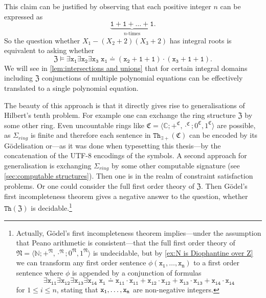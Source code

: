 This claim can be justified by observing that each positive integer $n$ can
be expressed as
\[
  \underbrace{\mathtt{1 + 1 + … + 1}}_{n\text{-times}}.
\]
So the question whether $X_1 - (X_2 + 2) (X_3 + 2)$ has integral roots is
equivalent to asking whether
\[
  \mathfrak Z \models \mathtt{∃ x_1 ∃ x_2 ∃ x_3 \; x_1 \doteq (x_2 + 1 + 1) \cdot (x_3 + 1 + 1)}.
\]
We will see in \cref{lem:intersections and unions} that for certain integral
domains including $\mathfrak Z$ conjunctions of multiple polynomial equations
can be effectively translated to a single polynomial equation.

The beauty of this approach is that it directly gives rise to generalisations of
Hilbert's tenth problem. For example one can exchange the ring structure
$\mathfrak Z$ by some other ring. Even uncountable rings like $\mathfrak C = ⟨ℂ;
+^{\mathfrak C}, \cdot^{\mathfrak C}; 0^{\mathfrak C}, 1^{\mathfrak C}⟩$ are
possible, as $Σ_{ring}$ is finite and therefore each sentence in
$\mathtt{Th}_{∃+}(\mathfrak{C})$ can be encoded by its Gödelisation or---as it
was done when typesetting this thesis---by the concatenation of the
\textsc{UTF-8} encodings of the symbols.
A second approach for generalisation is exchanging $Σ_{ring}$ by some other
computable signature (see \cref{sec:computable structures}). Then one is in the
realm of constraint satisfaction problems. Or one could consider the full first
order theory of $\mathfrak Z$. Then Gödel's first incompleteness theorem gives a
negative answer to the question, whether $\mathtt{Th}(\mathfrak Z)$ is
decidable.\footnote{Actually, Gödel's first incompleteness theorem
implies---under the assumption that Peano arithmetic is consistent---that the
full first order theory of $\mathfrak N = ⟨ℕ; +^{\mathfrak N}, \cdot^{\mathfrak
N}; 0^{\mathfrak N}, 1^{\mathfrak N}⟩$ is undecidable, but by \cref{ex:N is
Diophantine over Z} we can transform any first order sentence $\mathtt{ϕ(x_1, …,
x_n)}$ to a first order sentence where $\mathtt ϕ$ is appended by a conjunction
of formulas
\[
  \mathtt{ ∃ x_{i1} ∃x_{i2} ∃x_{i3} ∃x_{i4} \; x_i \doteq x_{i1} \cdot x_{i1} +
  x_{i2} \cdot x_{i2} + x_{i3} \cdot x_{i3} + x_{i4} \cdot x_{i4}}
\]
for $1 ≤ i ≤ n$, stating that $\mathtt{x_{1},\ldots,x_{n}}$ are non-negative integers.
}

